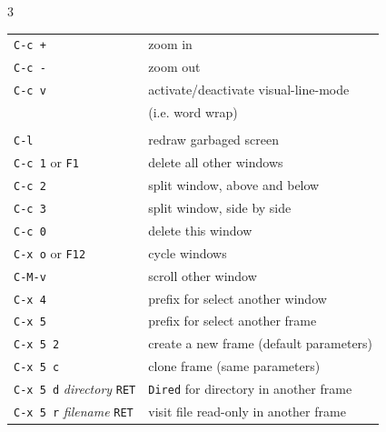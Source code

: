 \documentclass[11pt,landscape,a4paper]{article}
\begin{document}
\begin{multicols}{3}
\begin{tabular}{@{}ll@{}}
{\color{darkred}\verb|C-c +|} 			& zoom in\\
{\color{darkred}\verb|C-c -|} 			& zoom out\\
{\color{darkred}\verb|C-c v|} 			& activate/deactivate visual-line-mode\\ & (i.e. word wrap)\\
\\
{\verb|C-l|} 							& redraw garbaged screen\\
{\verb|C-c 1|} or {\color{orange}\verb|F1|}				& delete all other windows\\
{\verb|C-c 2|} 							& split window, above and below\\
{\verb|C-c 3|} 							& split window, side by side\\
{\verb|C-c 0|} 							& delete this window\\
{\verb|C-x o|} or {\color{orange} \verb|F12|}			& cycle windows\\
{\verb|C-M-v|} 							& scroll other window\\
\verb|C-x 4| & prefix for select another window\\ 
\verb|C-x 5| & prefix for select another frame\\ 
{\verb|C-x 5 2|}	& create a new frame (default parameters)\\
{\verb|C-x 5 c|}	& clone frame (same parameters)\\
{\verb|C-x 5 d| \textit{directory} \verb|RET|}	& \verb|Dired| for directory in another frame\\
{\verb|C-x 5 r| \textit{filename} \verb|RET|}	& visit file read-only in another frame\\





\end{tabular}
\end{multicols}
\end{document}
